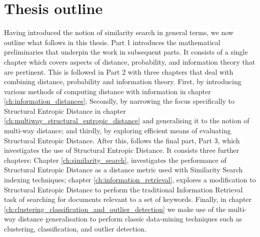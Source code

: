 \section{Thesis outline}
Having introduced the notion of similarity search in general terms, we now outline what follows in this thesis.  Part 1 introduces the mathematical preliminaries that underpin the work in subsequent parts.  It consists of a single chapter which covers aspects of distance, probability, and information theory that are pertinent.  This is followed in Part 2 with three chapters that deal with combining distance, probability and information theory. First, by introducing various methods of computing distance with information in chapter \ref{ch:information_distances}; Secondly, by narrowing the focus specifically to Structural Entropic Distance in chapter \ref{ch:multiway_structural_entropic_distance} and generalising it to the notion of multi-way distance; and thirdly, by exploring efficient means of evaluating Structural Entropic Distance.  After this, follows the final part, Part 3, which investigates the use of Structural Entropic Distance.  It consists three further chapters: Chapter \ref{ch:similarity_search}, investigates the performance of Structural Entropic Distance as a distance metric used with Similarity Search indexing techniques; chapter \ref{ch:information_retrieval}, explores a modification to Structural Entropic Distance to perform the traditional Information Retrieval task of searching for documents relevant to a set of keywords.  Finally, in chapter \ref{ch:clustering_classification_and_outlier_detection} we make use of the multi-way distance generalisation to perform classic data-mining techniques such as clustering, classification, and outlier detection.